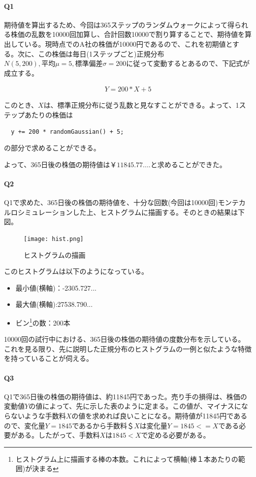 \documentclass[dvipdfmx]{jsarticle}
\begin{document}
\paragraph{Q1}
期待値を算出するため、今回は365ステップのランダムウォークによって得られる株価の乱数を10000回加算し、合計回数10000で割り算することで、期待値を算出している。現時点でのA社の株価が10000円であるので、これを初期値とする。次に、この株価は毎日(1ステップごと)正規分布$N(5, 200), 平均\mu = 5, 標準偏差\sigma = 200$に従って変動するとあるので、下記式が成立する。
\begin{center}
  \begin{align*}
    Y = 200 * X + 5
  \end{align*}
\end{center}
このとき、$X$は、標準正規分布に従う乱数と見なすことができる。よって、1ステップあたりの株価は
\begin{verbatim}
  y += 200 * randomGaussian() + 5;
\end{verbatim}
の部分で求めることができる。\par
よって、365日後の株価の期待値は$￥11845.77....$と求めることができた。
\paragraph{Q2}
Q1で求めた、365日後の株価の期待値を、十分な回数(今回は10000回)モンテカルロシミュレーションした上、ヒストグラムに描画する。そのときの結果は下図。
\begin{figure}[H]
  \centering
  \texttt{[image: hist.png]}
  \caption{ヒストグラムの描画}
\end{figure}
このヒストグラムは以下のようになっている。
\begin{itemize}
  \item 最小値(横軸)：-2305.727...
  \item 最大値(横軸):27538.790...
  \item ビン\footnote{ヒストグラム上に描画する棒の本数。これによって横軸(棒１本あたりの範囲)が決まる}の数：200本
\end{itemize}
10000回の試行中における、365日後の株価の期待値の度数分布を示している。
これを見る限り、先に説明した正規分布のヒストグラムの一例と似たような特徴を持っていることが伺える。
\paragraph{Q3}
Q1で365日後の株価の期待値は、約11845円であった。売り手の損得は、株価の変動値$Y$の値によって、先に示した表のように定まる。この値が、マイナスにならないような手数料$X$の値を求めれば良いことになる。期待値が11845円であるので、変化量$Y = 1845$であるから手数料＄$X$は変化量$Y = 1845 <= X$である必要がある。したがって、手数料$X$は$1845 < X$で定める必要がある。
\end{document}
